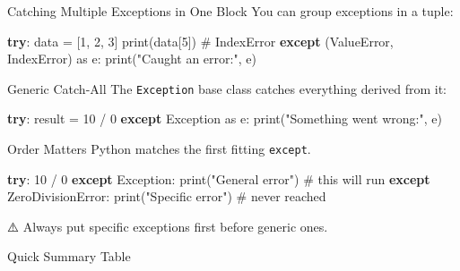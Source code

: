 \documentclass[
  letterpaper,
  DIV=11,
  numbers=noendperiod]{scrreprt}
\newenvironment{Shaded}{\begin{snugshade}}{\end{snugshade}}
\newcommand{\BuiltInTok}[1]{\textcolor[rgb]{0.00,0.23,0.31}{#1}}
\newcommand{\CommentTok}[1]{\textcolor[rgb]{0.37,0.37,0.37}{#1}}
\newcommand{\ControlFlowTok}[1]{\textcolor[rgb]{0.00,0.23,0.31}{\textbf{#1}}}
\newcommand{\DecValTok}[1]{\textcolor[rgb]{0.68,0.00,0.00}{#1}}
\newcommand{\ImportTok}[1]{\textcolor[rgb]{0.00,0.46,0.62}{#1}}
\newcommand{\NormalTok}[1]{\textcolor[rgb]{0.00,0.23,0.31}{#1}}
\newcommand{\OperatorTok}[1]{\textcolor[rgb]{0.37,0.37,0.37}{#1}}
\newcommand{\PreprocessorTok}[1]{\textcolor[rgb]{0.68,0.00,0.00}{#1}}
\newcommand{\StringTok}[1]{\textcolor[rgb]{0.13,0.47,0.30}{#1}}
\begin{document}
Catching Multiple Exceptions in One Block You can group exceptions in a
tuple:

\begin{Shaded}
\begin{Highlighting}[]
\ControlFlowTok{try}\NormalTok{:}
\NormalTok{    data }\OperatorTok{=}\NormalTok{ [}\DecValTok{1}\NormalTok{, }\DecValTok{2}\NormalTok{, }\DecValTok{3}\NormalTok{]}
    \BuiltInTok{print}\NormalTok{(data[}\DecValTok{5}\NormalTok{])    }\CommentTok{\# IndexError}
\ControlFlowTok{except}\NormalTok{ (}\PreprocessorTok{ValueError}\NormalTok{, }\PreprocessorTok{IndexError}\NormalTok{) }\ImportTok{as}\NormalTok{ e:}
    \BuiltInTok{print}\NormalTok{(}\StringTok{"Caught an error:"}\NormalTok{, e)}
\end{Highlighting}
\end{Shaded}

Generic Catch-All The \texttt{Exception} base class catches everything
derived from it:

\begin{Shaded}
\begin{Highlighting}[]
\ControlFlowTok{try}\NormalTok{:}
\NormalTok{    result }\OperatorTok{=} \DecValTok{10} \OperatorTok{/} \DecValTok{0}
\ControlFlowTok{except} \PreprocessorTok{Exception} \ImportTok{as}\NormalTok{ e:}
    \BuiltInTok{print}\NormalTok{(}\StringTok{"Something went wrong:"}\NormalTok{, e)}
\end{Highlighting}
\end{Shaded}

Order Matters Python matches the first fitting \texttt{except}.

\begin{Shaded}
\begin{Highlighting}[]
\ControlFlowTok{try}\NormalTok{:}
    \DecValTok{10} \OperatorTok{/} \DecValTok{0}
\ControlFlowTok{except} \PreprocessorTok{Exception}\NormalTok{:}
    \BuiltInTok{print}\NormalTok{(}\StringTok{"General error"}\NormalTok{)     }\CommentTok{\# this will run}
\ControlFlowTok{except} \PreprocessorTok{ZeroDivisionError}\NormalTok{:}
    \BuiltInTok{print}\NormalTok{(}\StringTok{"Specific error"}\NormalTok{)    }\CommentTok{\# never reached}
\end{Highlighting}
\end{Shaded}

⚠️ Always put specific exceptions first before generic ones.

Quick Summary Table
\end{document}
